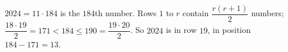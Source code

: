 $2024=11\cdot184$ is the $184$th number. Rows $1$ to $r$ contain $\dfrac{r(r+1)}{2}$ numbers; $\dfrac{18\cdot19}{2}=171<184\le190=\dfrac{19\cdot20}{2}$. So $2024$ is in row $\boxed{19}$, in position $184-171=\boxed{13}$.
